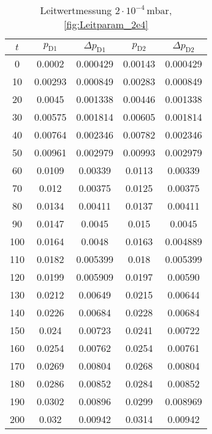 \begin{table}[H]
    \centering
    \caption{Leitwertmessung $2 \cdot 10^{-4} \, \si{\milli\bar}$, \ref{fig:Leitparam_2e4}}
    \label{tab:Leitparam_2e4}
    \begin{tabular}{c c c c c}
        \toprule
        {$t$} & {$p_\text{D1}$} & {$\Delta p_\text{D1}$} & {$p_\text{D2}$} & {$\Delta p_\text{D2}$} \\
        \midrule
        0 & 0.0002 & 0.000429 & 0.00143 & 0.000429\\
        10 & 0.00293 & 0.000849 & 0.00283 & 0.000849\\
        20 & 0.0045 & 0.001338 & 0.00446 & 0.001338\\
        30 & 0.00575 & 0.001814 & 0.00605 & 0.001814\\
        40 & 0.00764 & 0.002346 & 0.00782 & 0.002346\\
        50 & 0.00961 & 0.002979 & 0.00993 & 0.002979\\
        60 & 0.0109 & 0.00339 & 0.0113 & 0.00339\\
        70 & 0.012 & 0.00375 & 0.0125 & 0.00375\\
        80 & 0.0134 & 0.00411 & 0.0137 & 0.00411\\
        90 & 0.0147 & 0.0045 & 0.015 & 0.0045\\
        100 & 0.0164 & 0.0048 & 0.0163 & 0.004889\\
        110 & 0.0182 & 0.005399 & 0.018 & 0.005399\\
        120 & 0.0199 & 0.005909 & 0.0197 & 0.00590\\
        130 & 0.0212 & 0.00649 & 0.0215 & 0.00644\\
        140 & 0.0226 & 0.00684 & 0.0228 & 0.00684\\
        150 & 0.024 & 0.00723 & 0.0241 & 0.00722\\
        160 & 0.0254 & 0.00762 & 0.0254 & 0.00761\\
        170 & 0.0269 & 0.00804 & 0.0268 & 0.00804\\
        180 & 0.0286 & 0.00852 & 0.0284 & 0.00852\\
        190 & 0.0302 & 0.00896 & 0.0299 & 0.008969\\
        200 & 0.032 & 0.00942 & 0.0314 & 0.00942\\
        \bottomrule
    \end{tabular}
\end{table}


